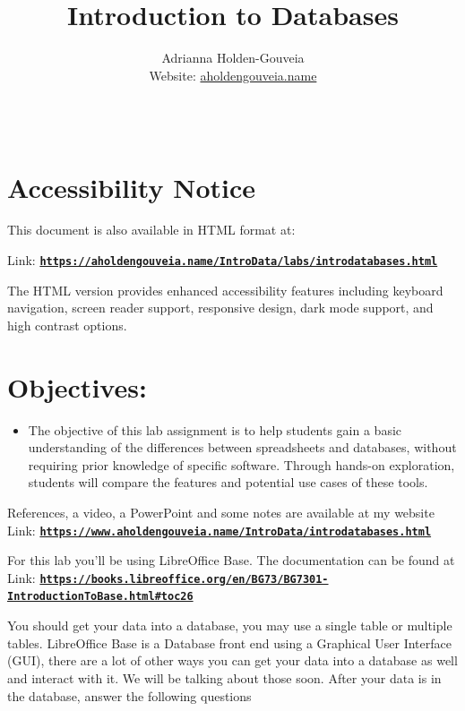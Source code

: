 \documentclass[12pt]{article}
\title{Introduction to Databases}
\author{
        Adrianna Holden-Gouveia \\
        Website: \href{https://aholdengouveia.name}{aholdengouveia.name}\\ 
        \date{\vspace{-5ex}}
        \faGithub {: aholdengouveia} \\
        }
\begin{document}
    

\maketitle



\section*{Accessibility Notice}
This document is also available in HTML format at:

Link: \href{https://aholdengouveia.name/IntroData/labs/introdatabases.html}{\textbf{\nolinkurl{https://aholdengouveia.name/IntroData/labs/introdatabases.html}}}

The HTML version provides enhanced accessibility features including keyboard navigation, screen reader support, responsive design, dark mode support, and high contrast options.

\section*{Objectives:}
\begin{itemize}
    \item The objective of this lab assignment is to help students gain a basic understanding of the differences between spreadsheets and databases, without requiring prior knowledge of specific software. Through hands-on exploration, students will compare the features and potential use cases of these tools.
\end{itemize}


References, a video, a PowerPoint and some notes are available at my website
Link: \href{https://www.aholdengouveia.name/IntroData/introdatabases.html}{\textbf{\nolinkurl{https://www.aholdengouveia.name/IntroData/introdatabases.html}}}

For this lab you'll be using LibreOffice Base.  The documentation can be found at Link: \href{https://books.libreoffice.org/en/BG73/BG7301-IntroductionToBase.html#toc26}{\textbf{\nolinkurl{https://books.libreoffice.org/en/BG73/BG7301-IntroductionToBase.html\#toc26}}}

You should get your data into a database, you may use a single table or multiple tables. LibreOffice Base is a Database front end using a Graphical User Interface (GUI), there are a lot of other ways you can get your data into a database as well and interact with it. We will be talking about those soon. After your data is in the database, answer the following questions
\end{document}
